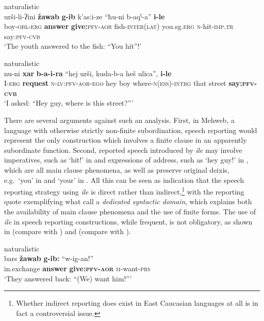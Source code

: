 \documentclass[output=paper,colorlinks,citecolor=brown]{langscibook}
\begin{document}
\ea \label{ex:DD51} \textnormal{naturalistic} \\
\gll urši-li-ʔini \textbf{žawab} \textbf{g-ib} k'asːi-ze ``ħu-ni b-aqˁ-a'' \textbf{i-le} \\
boy-\textsc{obl-erg} \textbf{answer} \textbf{give:}\textsc{pfv-aor} fish-\textsc{inter(lat)} you.sg.\textsc{erg} \textsc{n}-hit-\textsc{imp.tr} say:\textsc{pfv-cvb} \\
\glt `The youth answered to the fish: ``You hit''!'
\z

\ea \label{ex:DD52} \textnormal{naturalistic} \\
\gll nu-ni \textbf{xar} \textbf{b-a-i-ra} ``hej urši, kuda-b-a heš ulica'', \textbf{i-le} \\
I-\textsc{erg} \textbf{request} \textsc{n-lv:pfv-aor-ego} hey boy where-\textsc{n(ess)-intrg} that street \textbf{say:\textsc{pfv-cvb}} \\
\glt `I asked: ``Hey guy, where is this street?'''
\z

 There are several arguments against such an analysis. First, in Mehweb, a language with otherwise strictly non-finite subordination, speech reporting would represent the only construction which involves a finite clause in an apparently subordinate function. Second, reported speech introduced by \textit{ile} may involve imperatives, such as `hit!' in  and expressions of address, such as `hey guy!' in , which are all main clause phenomena, as well as preserve original deixis, e.g.\  `you' in  and `your' in . All this can be seen as indication that the speech reporting strategy using \textit{ile} is direct rather than indirect,\footnote{Whether indirect reporting does exist in East Caucasian languages at all is in fact a controversial issue.} with the reporting quote exemplifying what \citet{SpronckNikitina2019} call a \textit{dedicated syntactic domain}, which explains both the availability of main clause phenomena and the use of finite forms. The use of \textit{ile} in speech reporting constructions, while frequent, is not obligatory, as shown in  (compare with ) and  (compare with ).

\ea \label{ex:DD53} \textnormal{naturalistic} \\
\gll bars \textbf{žawab} \textbf{g-ib:} ``w-ig-an!'' \\
in.exchange \textbf{answer} \textbf{give:\textsc{pfv-aor}} \textsc{m}-want-\textsc{prs} \\
\glt `They answered back: ``(We) want him!''{}'
\z
\end{document}
